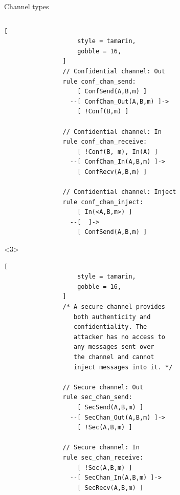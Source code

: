 \documentclass[11pt,aspectratio=169]{beamer}
\begin{document}
\begin{frame}[t,fragile]{Channel types}
\begin{columns}[T]
\begin{column}{0.45\textwidth}
\begin{onlyenv}
\begin{lstlisting}[
                    style = tamarin,
                    gobble = 16,
                ]
                // Confidential channel: Out
                rule conf_chan_send:
                    [ ConfSend(A,B,m) ]
                  --[ ConfChan_Out(A,B,m) ]->
                    [ !Conf(B,m) ]

                // Confidential channel: In
                rule conf_chan_receive:
                    [ !Conf(B, m), In(A) ]
                  --[ ConfChan_In(A,B,m) ]->
                    [ ConfRecv(A,B,m) ]

                // Confidential channel: Inject
                rule conf_chan_inject:
                    [ In(<A,B,m>) ]
                  --[  ]->
                    [ ConfSend(A,B,m) ]
                \end{lstlisting}
            \end{onlyenv}
            \begin{onlyenv}<3>
                \begin{lstlisting}[
                    style = tamarin,
                    gobble = 16,
                ]
                /* A secure channel provides
                   both authenticity and
                   confidentiality. The
                   attacker has no access to
                   any messages sent over
                   the channel and cannot
                   inject messages into it. */

                // Secure channel: Out
                rule sec_chan_send:
                    [ SecSend(A,B,m) ]
                  --[ SecChan_Out(A,B,m) ]->
                    [ !Sec(A,B,m) ]
                
                // Secure channel: In
                rule sec_chan_receive:
                    [ !Sec(A,B,m) ]
                  --[ SecChan_In(A,B,m) ]->
                    [ SecRecv(A,B,m) ]
                \end{lstlisting}
            \end{onlyenv}
        \end{column}
    \end{columns}
\end{frame}

\end{document}
